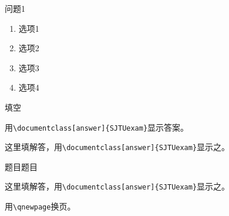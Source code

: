 \documentclass{SJTUexam}
\begin{document}
\newcommand{\testpapertype}{A卷}
\newcommand{\course}{Course}
\newcommand{\courseterm}{2023 至 2024 学年\ 第 1 学期}
\maketitle
{}
\begin{subquestion}
    问题1
    \begin{enumerate}
        \item 选项1
        \item 选项2
        \item 选项3
        \item 选项4
    \end{enumerate}
\end{subquestion}
\begin{subquestion}
填空
\end{subquestion}

\qnewpage
{}
\begin{subquestion}
	用\verb|\documentclass[answer]{SJTUexam}|显示答案。
\end{subquestion}
\begin{answer}
    这里填解答，用\verb|\documentclass[answer]{SJTUexam}|显示之。
\end{answer}
\begin{subquestion}
	题目题目
\end{subquestion}
\begin{answer}
    这里填解答，用\verb|\documentclass[answer]{SJTUexam}|显示之。
\end{answer}
\begin{subquestion}
	用\verb|\qnewpage|换页。
\end{subquestion}
\end{document}
